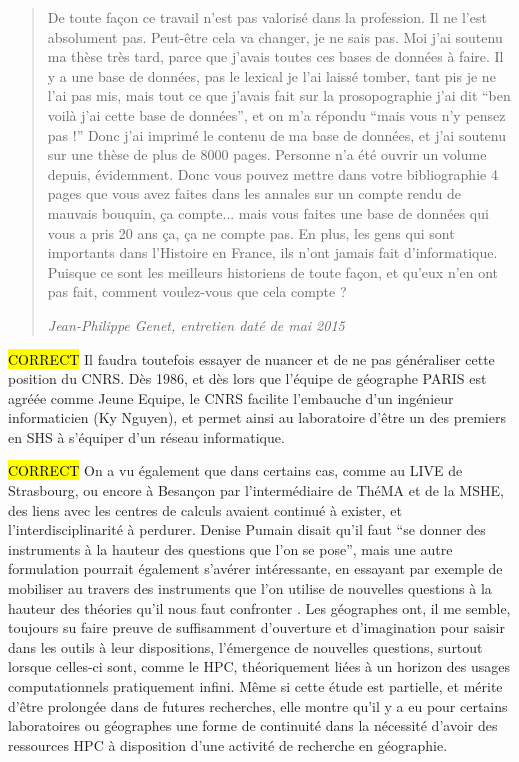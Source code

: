 \blockquote[\textit{Jean-Philippe Genet, entretien daté de mai 2015}]{De toute façon ce travail n’est pas valorisé dans la profession. Il ne l'est absolument pas. Peut-être cela va changer, je ne sais pas. Moi j'ai soutenu ma thèse très tard, parce que j'avais toutes ces bases de données à faire. Il y a une base de données, pas le lexical je l'ai laissé tomber, tant pis je ne l'ai pas mis, mais tout ce que j'avais fait sur la prosopographie j'ai dit \enquote{ben voilà j'ai cette base de données}, et on m'a répondu \enquote{mais vous n'y pensez pas !} Donc j'ai imprimé le contenu de ma base de données, et j'ai soutenu sur une thèse de plus de 8000 pages. Personne n'a été ouvrir un volume depuis, évidemment. Donc vous pouvez mettre dans votre bibliographie 4 pages que vous avez faites dans les annales sur un compte rendu de mauvais bouquin, ça compte... mais vous faites une base de données qui vous a pris 20 ans ça, ça ne compte pas. En plus, les gens qui sont importants dans l'Histoire en France, ils n'ont jamais fait d'informatique. Puisque ce sont les meilleurs historiens de toute façon, et qu’eux n'en ont pas fait, comment voulez-vous que cela compte ?}

\hl{CORRECT}
Il faudra toutefois essayer de nuancer et de ne pas généraliser cette position du CNRS. Dès 1986, et dès lors que l'équipe de géographe PARIS est agréée comme Jeune Equipe, le CNRS facilite l'embauche d'un ingénieur informaticien (Ky Nguyen), et permet ainsi au laboratoire d'être un des premiers en SHS à s'équiper d'un réseau informatique.

\hl{CORRECT}
On a vu également que dans certains cas, comme au LIVE de Strasbourg, ou encore à Besançon par l'intermédiaire de ThéMA et de la MSHE, des liens avec les centres de calculs avaient continué à exister, et l'interdisciplinarité à perdurer. Denise Pumain disait qu'il faut \enquote{se donner des instruments à la hauteur des questions que l'on se pose}, mais une autre formulation pourrait également s'avérer intéressante, en essayant par exemple de mobiliser au travers des instruments que l'on utilise de nouvelles questions à la hauteur des théories qu'il nous faut confronter . Les géographes ont, il me semble, toujours su faire preuve de suffisamment d'ouverture et d'imagination pour saisir dans les outils à leur dispositions, l'émergence de nouvelles questions, surtout lorsque celles-ci sont, comme le HPC, théoriquement liées à un horizon des usages computationnels pratiquement infini. Même si cette étude est partielle, et mérite d'être prolongée dans de futures recherches, elle montre qu'il y a eu pour certains laboratoires ou géographes une forme de continuité dans la nécessité d'avoir des ressources HPC à disposition d'une activité de recherche en géographie.

